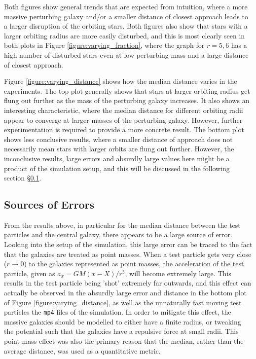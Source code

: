 \documentclass[twoside,twocolumn]{article}
\begin{document}
        Both figures show general trends that are expected from intuition, where a more massive perturbing galaxy and/or a smaller distance of closest approach leads to a larger disruption of the orbiting stars. Both figures also show that stars with a larger orbiting radius are more easily disturbed, and this is most clearly seen in both plots in Figure \ref{figure:varying_fraction}, where the graph for $r = 5, 6$ has a high number of disturbed stars even at low perturbing mass and a large distance of closest approach. 
        
        Figure \ref{figure:varying_distance} shows how the median distance varies in the experiments. The top plot generally shows that stars at larger orbiting radius get flung out further as the mass of the perturbing galaxy increases. It also shows an interesting characteristic, where the median distance for different orbiting radii appear to converge at larger masses of the perturbing galaxy. However, further experimentation is required to provide a more concrete result. The bottom plot shows less conclusive results, where a smaller distance of approach does not necessarily mean stars with larger orbits are flung out further. However, the inconclusive results, large errors and absurdly large values here might be a product of the simulation setup, and this will be discussed in the following section \S \ref{section:error}.  
        
         
    \subsection{Sources of Errors}
        \label{section:error}

        From the results above, in particular for the median distance between the test particles and the central galaxy, there appears to be a large source of error. Looking into the setup of the simulation, this large error can be traced to the fact that the galaxies are treated as point masses. When a test particle gets very close ($r \to 0$) to the galaxies represented as point masses, the acceleration of the test particle, given as $a_{x} = GM(x - X) / r^3$, will become extremely large. This results in the test particle being 'shot' extremely far outwards, and this effect can actually be observed in the absurdly large error and distance in the bottom plot of Figure \ref{figure:varying_distance}, as well as the unnaturally fast moving test particles the \texttt{mp4} files of the simulation. In order to mitigate this effect, the massive galaxies should be modelled to either have a finite radius, or tweaking the potential such that the galaxies have a repulsive force at small radii. This point mass effect was also the primary reason that the median, rather than the average distance, was used as a quantitative metric. 
\end{document}
